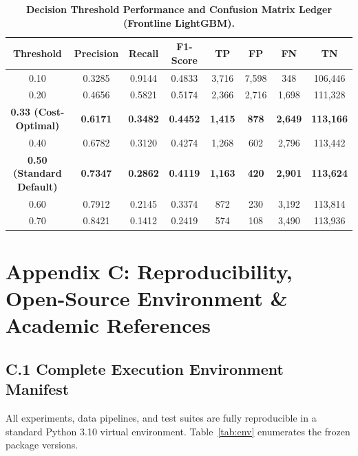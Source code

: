 \documentclass[10pt,a4paper]{article}
\begin{document}
\vspace{-2pt}
\begin{table}[h!]
\centering
\scriptsize
\renewcommand{\arraystretch}{0.74}
\caption{\textbf{Decision Threshold Performance and Confusion Matrix Ledger (Frontline LightGBM).}}
\label{tab:threshold_audit}
\vspace{1pt}
\begin{tabularx}{\linewidth}{@{}cccccccc@{}}
\toprule
\textbf{Threshold} & \textbf{Precision} & \textbf{Recall} & \textbf{F1-Score} & \textbf{TP} & \textbf{FP} & \textbf{FN} & \textbf{TN} \\
\midrule
0.10 & 0.3285 & 0.9144 & 0.4833 & 3,716 & 7,598 & 348 & 106,446 \\
0.20 & 0.4656 & 0.5821 & 0.5174 & 2,366 & 2,716 & 1,698 & 111,328 \\
\textbf{0.33 (Cost-Optimal)} & \textbf{0.6171} & \textbf{0.3482} & \textbf{0.4452} & \textbf{1,415} & \textbf{878} & \textbf{2,649} & \textbf{113,166} \\
0.40 & 0.6782 & 0.3120 & 0.4274 & 1,268 & 602 & 2,796 & 113,442 \\
\textbf{0.50 (Standard Default)} & \textbf{0.7347} & \textbf{0.2862} & \textbf{0.4119} & \textbf{1,163} & \textbf{420} & \textbf{2,901} & \textbf{113,624} \\
0.60 & 0.7912 & 0.2145 & 0.3374 & 872 & 230 & 3,192 & 113,814 \\
0.70 & 0.8421 & 0.1412 & 0.2419 & 574 & 108 & 3,490 & 113,936 \\
\bottomrule
\end{tabularx}
\end{table}

\clearpage


\section*{Appendix C: Reproducibility, Open-Source Environment \& Academic References}

\subsection*{C.1 Complete Execution Environment Manifest}
All experiments, data pipelines, and test suites are fully reproducible in a standard Python 3.10 virtual environment. Table~\ref{tab:env} enumerates the frozen package versions.
\end{document}
